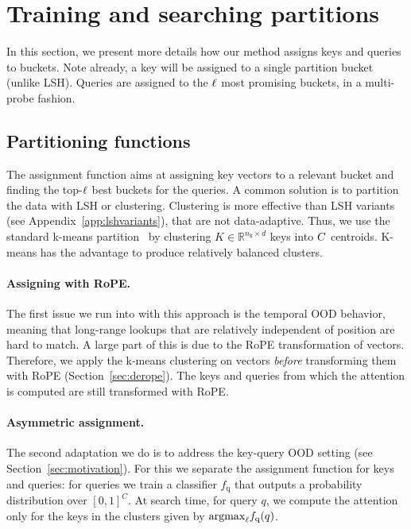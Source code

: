
\section{Training and searching partitions}
\label{sec:method}

In this section, we present more details how our \OURS method assigns keys and queries to buckets. %
%
%
Note already, a key will be assigned to a single partition bucket (unlike LSH). 
Queries are assigned to the $\ell$ most promising buckets, in a multi-probe fashion.
%
%

\subsection{Partitioning functions}

\newcommand{\nq}{n_{\mathrm{q}}}
\newcommand{\nk}{n_{\mathrm{k}}}

The assignment function aims at assigning key vectors  to a relevant bucket and finding the top-$\ell$ best buckets for the queries.
A common solution is to partition the data with LSH or clustering. 
Clustering is more effective than LSH variants (see Appendix~\ref{app:lshvariants}), that are not data-adaptive. 
%
Thus, we use the standard k-means partition~\citep{jegou2010product} by clustering $K\in \mathbb{R}^{\nk \times d}$ keys into $C$ centroids. 
K-means has the advantage to produce relatively balanced clusters. 
%

\paragraph{Assigning with RoPE. }
The first issue we run into with this approach is the temporal OOD behavior, meaning that long-range lookups that are relatively independent of position are hard to match.  
A large part of this is due to the RoPE transformation of vectors. 
Therefore, we apply the k-means clustering on vectors \emph{before} transforming them with RoPE (Section~\ref{sec:derope}). 
The keys and queries from which the attention is computed are still transformed with RoPE. 

\paragraph{Asymmetric assignment.} 
The second adaptation we do is to address the key-query OOD setting (see Section~\ref{sec:motivation}). 
For this we separate the assignment function for keys and queries: for queries we train a classifier $f_\mathrm{q}$ that  outputs a probability distribution over $[0,1]^C$. 
At search time, for query $q$, we compute the attention only for the keys in the clusters given by $\mathrm{argmax}_{\ell} f_\mathrm{q}(q)$. 




